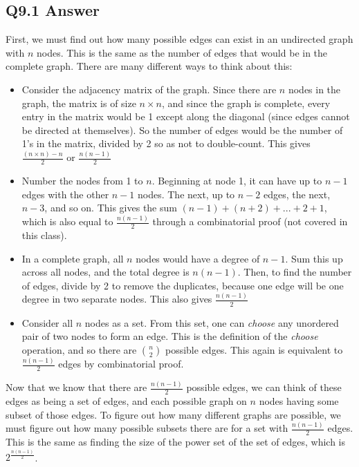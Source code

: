 \documentclass{article}
\begin{document}
\subsection*{Q9.1 Answer}
First, we must find out how many possible edges can exist in an undirected graph with $n$ nodes. This is the same as the number of edges that would be in the complete graph. There are many different ways to think about this:
\begin{itemize}
    \item Consider the adjacency matrix of the graph. Since there are $n$ nodes in the graph, the matrix is of size $n\times n$, and since the graph is complete, every entry in the matrix would be 1 except along the diagonal (since edges cannot be directed at themselves). So the number of edges would be the number of 1's in the matrix, divided by 2 so as not to double-count. This gives $\frac{(n\times n)-n}{2}$ or $\frac{n(n-1)}{2}$
    \item Number the nodes from 1 to $n$. Beginning at node 1, it can have up to $n-1$ edges with the other $n-1$ nodes. The next, up to $n-2$ edges, the next, $n-3$, and so on. This gives the sum $(n-1)+(n+2)+...+2+1$, which is also equal to $\frac{n(n-1)}{2}$ through a combinatorial proof (not covered in this class).
    \item In a complete graph, all $n$ nodes would have a degree of $n-1$. Sum this up across all nodes, and the total degree is $n(n-1)$. Then, to find the number of edges, divide by 2 to remove the duplicates, because one edge will be one degree in two separate nodes. This also gives $\frac{n(n-1)}{2}$
    \item Consider all $n$ nodes as a set. From this set, one can \textit{choose} any unordered pair of two nodes to form an edge. This is the definition of the \textit{choose} operation, and so there are $n\choose 2$ possible edges. This again is equivalent to $\frac{n(n-1)}{2}$ edges by combinatorial proof.
\end{itemize}
Now that we know that there are $\frac{n(n-1)}{2}$ possible edges, we can think of these edges as being a set of edges, and each possible graph on $n$ nodes having some subset of those edges. To figure out how many different graphs are possible, we must figure out how many possible subsets there are for a set with $\frac{n(n-1)}{2}$ edges. This is the same as finding the size of the power set of the set of edges, which is $2^{\frac{n(n-1)}{2}}$.
\newpage
\end{document}
